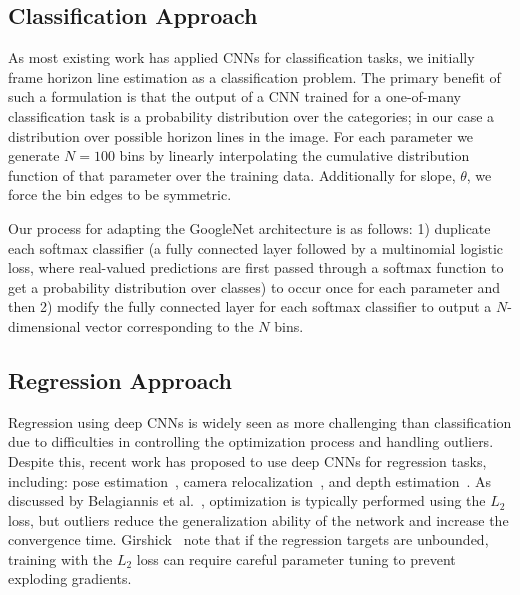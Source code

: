 \documentclass{bmvc2k}
\begin{document}
\subsection{Classification Approach}
\label{sec:classification}

As most existing work has applied CNNs for classification tasks, we
initially frame horizon line estimation as a classification problem.
The primary benefit of such a formulation is that the output of a CNN
trained for a one-of-many classification task is a probability
distribution over the categories; in our case a distribution over
possible horizon lines in the image. For each parameter we generate
$N=100$ bins by linearly interpolating the cumulative distribution
function of that parameter over the training data. Additionally for
slope, $\theta$, we force the bin edges to be symmetric. 

Our process for adapting the GoogleNet architecture is as follows: 1)
duplicate each softmax classifier (a fully connected layer followed by
a multinomial logistic loss, where real-valued predictions are first
passed through a softmax function to get a probability distribution
over classes) to occur once for each parameter and then 2) modify the
fully connected layer for each softmax classifier to output a
$N$-dimensional vector corresponding to the $N$ bins.



\subsection{Regression Approach}
\label{sec:regression}

Regression using deep CNNs is widely seen as more challenging than
classification due to difficulties in controlling the optimization
process and handling outliers.
Despite this, recent work has proposed to use deep CNNs for regression
tasks, including: pose estimation~\cite{tompson2015efficient}, camera
relocalization~\cite{kendall2015convolutional}, and depth
estimation~\cite{eigen2014depth}. As discussed by Belagiannis
et al.~\cite{belagiannis2015robust}, optimization is typically
performed using the $L_2$ loss, but outliers reduce the generalization
ability of the network and increase the convergence time.
Girshick~\cite{girshick2015fast} note that if the regression targets
are unbounded, training with the $L_2$ loss can require careful
parameter tuning to prevent exploding gradients. 
\end{document}

